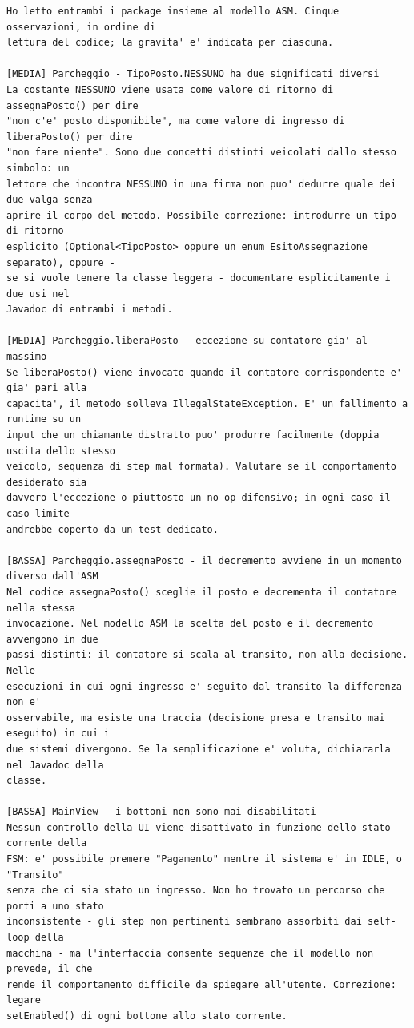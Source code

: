 \begin{lstlisting}[style=llm]
Ho letto entrambi i package insieme al modello ASM. Cinque osservazioni, in ordine di
lettura del codice; la gravita' e' indicata per ciascuna.

[MEDIA] Parcheggio - TipoPosto.NESSUNO ha due significati diversi
La costante NESSUNO viene usata come valore di ritorno di assegnaPosto() per dire
"non c'e' posto disponibile", ma come valore di ingresso di liberaPosto() per dire
"non fare niente". Sono due concetti distinti veicolati dallo stesso simbolo: un
lettore che incontra NESSUNO in una firma non puo' dedurre quale dei due valga senza
aprire il corpo del metodo. Possibile correzione: introdurre un tipo di ritorno
esplicito (Optional<TipoPosto> oppure un enum EsitoAssegnazione separato), oppure -
se si vuole tenere la classe leggera - documentare esplicitamente i due usi nel
Javadoc di entrambi i metodi.

[MEDIA] Parcheggio.liberaPosto - eccezione su contatore gia' al massimo
Se liberaPosto() viene invocato quando il contatore corrispondente e' gia' pari alla
capacita', il metodo solleva IllegalStateException. E' un fallimento a runtime su un
input che un chiamante distratto puo' produrre facilmente (doppia uscita dello stesso
veicolo, sequenza di step mal formata). Valutare se il comportamento desiderato sia
davvero l'eccezione o piuttosto un no-op difensivo; in ogni caso il caso limite
andrebbe coperto da un test dedicato.

[BASSA] Parcheggio.assegnaPosto - il decremento avviene in un momento diverso dall'ASM
Nel codice assegnaPosto() sceglie il posto e decrementa il contatore nella stessa
invocazione. Nel modello ASM la scelta del posto e il decremento avvengono in due
passi distinti: il contatore si scala al transito, non alla decisione. Nelle
esecuzioni in cui ogni ingresso e' seguito dal transito la differenza non e'
osservabile, ma esiste una traccia (decisione presa e transito mai eseguito) in cui i
due sistemi divergono. Se la semplificazione e' voluta, dichiararla nel Javadoc della
classe.

[BASSA] MainView - i bottoni non sono mai disabilitati
Nessun controllo della UI viene disattivato in funzione dello stato corrente della
FSM: e' possibile premere "Pagamento" mentre il sistema e' in IDLE, o "Transito"
senza che ci sia stato un ingresso. Non ho trovato un percorso che porti a uno stato
inconsistente - gli step non pertinenti sembrano assorbiti dai self-loop della
macchina - ma l'interfaccia consente sequenze che il modello non prevede, il che
rende il comportamento difficile da spiegare all'utente. Correzione: legare
setEnabled() di ogni bottone allo stato corrente.


\end{lstlisting}

